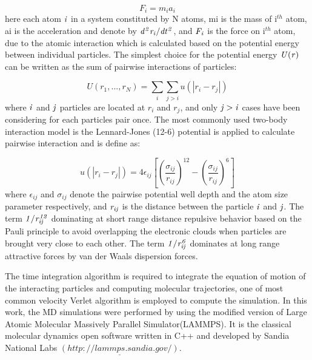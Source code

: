 \documentclass{CFD2010paper}
\begin{document}
\vspace{-.2em}
\begin{equation}
F_{i} = m_{i}a_{i}
\label{eq:Newton}
\end{equation}
\normalsize
here each atom $\it i $ in a system constituted by N atoms, mi is the mass of i$^{th}$ atom, ai is the acceleration and denote by $\it {d^2r_{i}} / {dt^2}$, and $\it F_{i}$ is the force on i$^{th}$ atom, due to the atomic interaction which is calculated based on the potential energy between individual particles.
The simplest choice for the potential energy $\it U(r)$  can be written as the sum of pairwise interactions of particles:

\vspace{-.2em}
\begin{equation}
U(r_{1}, ...  ,r_{N}) =  \displaystyle\sum_{i} \displaystyle\sum_{j>i}  u(|r_{i} - r_{j}|)
\label{eq:PEnergy}
\end{equation}
\normalsize
where $\it i$ and $\it j$ particles are located at $r_{i}$ and $r_{j}$, and only $\it j>i$ cases have been considering for each particles pair once.
The most commonly used two-body interaction model is the Lennard-Jones (12-6) potential is applied to calculate pairwise interaction and is define as:

\vspace{-.2em}
\begin{equation}
 u(|r_{i} - r_{j}|) = 4\epsilon_{ij}[(\frac{\sigma_{ij}}{r_{ij}})^{12}-(\frac{\sigma_{ij}}{r_{ij}})^{6}]
 \label{eq:LJ12}
\end{equation}
\normalsize
where $\epsilon_{ij}$ and $\sigma_{ij}$ denote the pairwise potential well depth and the atom size parameter respectively, and $\it r_{ij}$ is the distance between the particle $\it i$ and $\it j$.
The term $\it 1/r_{ij}^{12}$ dominating at short range distance repulsive behavior based on the Pauli principle to avoid overlapping the electronic clouds when particles are  brought very close to each other. The term $\it 1/r_{ij}^6$ dominates at long range attractive forces by van der Waals dispersion forces.

The time integration algorithm is required to integrate the equation of motion of the interacting particles and computing molecular trajectories, one of most common velocity Verlet algorithm is employed to compute the simulation.
In this work,  the MD simulations were performed by using the modified version of Large Atomic Molecular Massively Parallel Simulator(LAMMPS). It is the classical molecular dynamics open software written in C++ and developed by Sandia National Labs $\underline{(http://lammps.sandia.gov/)}$.
\end{document}
